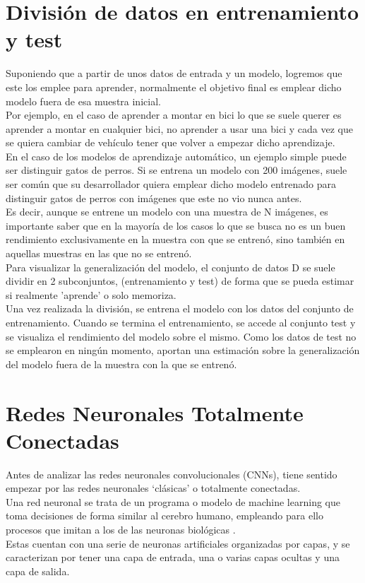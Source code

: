 \section{División de datos en entrenamiento y test}

Suponiendo que a partir de unos datos de entrada y un modelo, logremos que este los emplee para aprender, normalmente el objetivo final es emplear dicho modelo fuera de esa muestra inicial. \\
Por ejemplo, en el caso de aprender a montar en bici lo que se suele querer es aprender a montar en cualquier bici, no aprender a usar una bici y cada vez que se quiera cambiar de vehículo tener que volver a empezar dicho aprendizaje. \\
En el caso de los modelos de aprendizaje automático, un ejemplo simple puede ser distinguir gatos de perros. Si se entrena un modelo con 200 imágenes, suele ser común que su desarrollador quiera emplear dicho modelo entrenado para distinguir gatos de perros con imágenes que este no vio nunca antes. \\
Es decir, aunque se entrene un modelo con una muestra de N imágenes, es importante saber que en la mayoría de los casos lo que se busca no es un buen rendimiento exclusivamente en la muestra con que se entrenó, sino también en aquellas muestras en las que no se entrenó. \\
Para visualizar la generalización del modelo, el conjunto de datos D se suele dividir en 2 subconjuntos, (entrenamiento y test) de forma que se pueda estimar si realmente 'aprende' o solo memoriza.\\
Una vez realizada la división, se entrena el modelo con los datos del conjunto de entrenamiento. Cuando se termina el entrenamiento, se accede al conjunto test y se visualiza el rendimiento del modelo sobre el mismo. Como los datos de test no se emplearon en ningún momento, aportan una estimación sobre la generalización del modelo fuera de la muestra con la que se entrenó. 

\section{Redes Neuronales Totalmente Conectadas}

Antes de analizar las redes neuronales convolucionales (CNNs), tiene sentido empezar por las redes neuronales `clásicas' o totalmente conectadas. \\
Una red neuronal se trata de un programa o modelo de machine learning que toma decisiones de forma similar al cerebro humano, empleando para ello procesos que imitan a los de las neuronas biológicas \cite{NN_intro}. \\
Estas cuentan con una serie de neuronas artificiales organizadas por capas, y se caracterizan por tener una capa de entrada, una o varias capas ocultas y una capa de salida.

